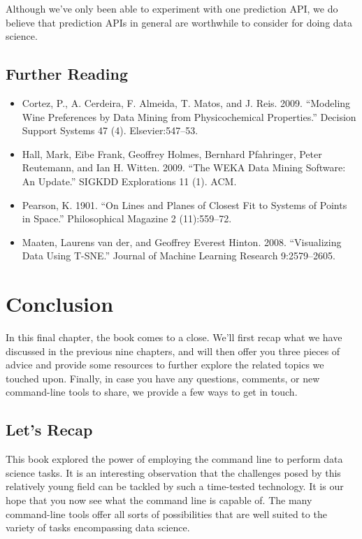 \documentclass[
]{book}
\providecommand{\tightlist}{%
  \setlength{\itemsep}{0pt}\setlength{\parskip}{0pt}}
\theoremstyle{definition}
\theoremstyle{definition}
\theoremstyle{definition}
\theoremstyle{remark}
\begin{document}
Although we've only been able to experiment with one prediction API, we do believe that prediction APIs in general are worthwhile to consider for doing data science.

\hypertarget{further-reading}{%
\section{Further Reading}\label{further-reading}}

\begin{itemize}
\tightlist
\item
  Cortez, P., A. Cerdeira, F. Almeida, T. Matos, and J. Reis. 2009. ``Modeling Wine Preferences by Data Mining from Physicochemical Properties.'' Decision Support Systems 47 (4). Elsevier:547--53.
\item
  Hall, Mark, Eibe Frank, Geoffrey Holmes, Bernhard Pfahringer, Peter Reutemann, and Ian H. Witten. 2009. ``The WEKA Data Mining Software: An Update.'' SIGKDD Explorations 11 (1). ACM.
\item
  Pearson, K. 1901. ``On Lines and Planes of Closest Fit to Systems of Points in Space.'' Philosophical Magazine 2 (11):559--72.
\item
  Maaten, Laurens van der, and Geoffrey Everest Hinton. 2008. ``Visualizing Data Using T-SNE.'' Journal of Machine Learning Research 9:2579--2605.
\end{itemize}

\hypertarget{chapter-10-conclusion}{%
\chapter{Conclusion}\label{chapter-10-conclusion}}

In this final chapter, the book comes to a close. We'll first recap what we have discussed in the previous nine chapters, and will then offer you three pieces of advice and provide some resources to further explore the related topics we touched upon. Finally, in case you have any questions, comments, or new command-line tools to share, we provide a few ways to get in touch.

\hypertarget{lets-recap}{%
\section{Let's Recap}\label{lets-recap}}

This book explored the power of employing the command line to perform data science tasks. It is an interesting observation that the challenges posed by this relatively young field can be tackled by such a time-tested technology. It is our hope that you now see what the command line is capable of. The many command-line tools offer all sorts of possibilities that are well suited to the variety of tasks encompassing data science.
\end{document}
